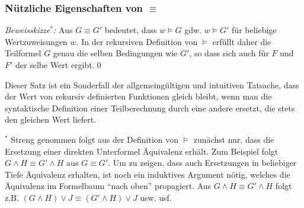 \documentclass[aspectratio=1610,onlymath]{beamer}
\begin{document}
\begin{frame}\frametitle{Nützliche Eigenschaften von $\equiv$}

% 


\pause

\emph{Beweisskizze${}^*$:} Aus $G\equiv G'$ bedeutet, dass $w\models G$ gdw. $w\models G'$ für beliebige Wertzuweisungen $w$.
In der rekursiven Definition von $\models$ erfüllt daher die Teilformel $G$ genau die selben Bedingungen wie $G'$, so
dass sich auch für $F$ und $F'$ der selbe Wert ergibt.\qed
\bigskip

Dieser Satz ist ein Sonderfall der allgemeingültigen und intuitiven Tatsache, dass der Wert von rekursiv definierten Funktionen gleich bleibt, wenn man die syntaktische Definition einer Teilberechnung durch eine andere ersetzt, die stets den gleichen Wert liefert.
\bigskip


{\tiny ${}^*$ Streng genommen folgt aus der Definition von $\models$ zunächst nur, dass die Ersetzung einer direkten Unterformel
Äquivalenz erhält. Zum Beispiel folgt $G\wedge H\equiv G'\wedge H$ aus $G\equiv G'$. Um zu zeigen, dass auch Ersetzungen in beliebiger Tiefe Äquivalenz erhalten, ist noch ein induktives Argument nötig, welches die Äquivalenz im Formelbaum "`nach oben"' propagiert. Aus $G\wedge H\equiv G'\wedge H$ folgt z.B. $(G\wedge H)\vee J\equiv (G'\wedge H)\vee J$ usw. usf.
}

\end{frame}
\end{document}
